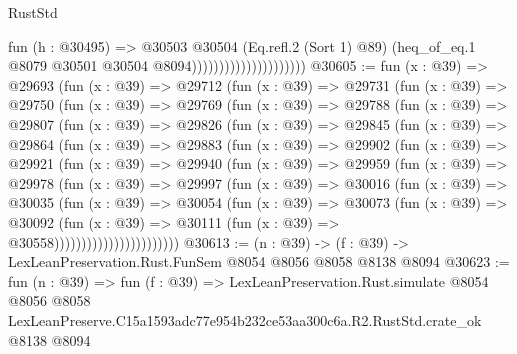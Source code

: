 \begin{lexlean}{RustStd}
\begin{coremodule}
                                          fun (h : @30495) =>
                                          @30503
                                            @30504
                                            (Eq.refl.{2} (Sort 1) @89)
                                            (heq_of_eq.{1}
                                              @8079
                                              @30501
                                              @30504
                                              @8094)))))))))))))))))))))
@30605 := fun (x : @39) =>
  @29693
    (fun (x : @39) =>
    @29712
      (fun (x : @39) =>
      @29731
        (fun (x : @39) =>
        @29750
          (fun (x : @39) =>
          @29769
            (fun (x : @39) =>
            @29788
              (fun (x : @39) =>
              @29807
                (fun (x : @39) =>
                @29826
                  (fun (x : @39) =>
                  @29845
                    (fun (x : @39) =>
                    @29864
                      (fun (x : @39) =>
                      @29883
                        (fun (x : @39) =>
                        @29902
                          (fun (x : @39) =>
                          @29921
                            (fun (x : @39) =>
                            @29940
                              (fun (x : @39) =>
                              @29959
                                (fun (x : @39) =>
                                @29978
                                  (fun (x : @39) =>
                                  @29997
                                    (fun (x : @39) =>
                                    @30016
                                      (fun (x : @39) =>
                                      @30035
                                        (fun (x : @39) =>
                                        @30054
                                          (fun (x : @39) =>
                                          @30073
                                            (fun (x : @39) =>
                                            @30092
                                              (fun (x : @39) =>
                                              @30111 (fun (x : @39) => @30558)))))))))))))))))))))))
@30613 := (n : @39) -> (f : @39) -> LexLeanPreservation.Rust.FunSem @8054 @8056 @8058 @8138 @8094
@30623 := fun (n : @39) =>
  fun (f : @39) =>
  LexLeanPreservation.Rust.simulate
    @8054
    @8056
    @8058
    LexLeanPreserve.C15a1593adc77e954b232ce53aa300c6a.R2.RustStd.crate_ok
    @8138
    @8094
\end{coremodule}
\end{lexlean}
